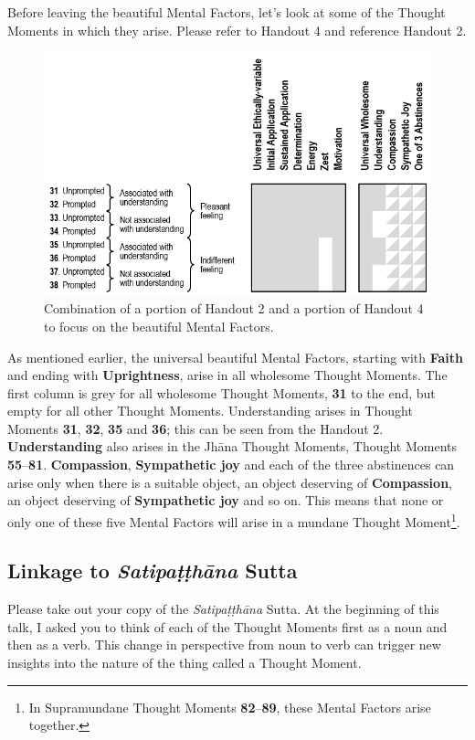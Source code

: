 Before leaving the beautiful Mental Factors, let’s look at some of the Thought Moments in which they arise. Please refer to Handout 4 and reference Handout 2.

\begin{figure}[h]
\centering
\includegraphics[width=0.9\linewidth]{./Diagrams/Wholesome}
\caption{Combination of a portion of Handout 2 and a portion of Handout 4 to focus on the beautiful Mental Factors.}
\label{fig:Wholesome}
\end{figure}

As mentioned earlier, the universal beautiful Mental Factors, starting with \textbf{Faith} and ending with \textbf{Uprightness}, arise in all wholesome Thought Moments. The first column is grey for all wholesome Thought Moments, \textbf{31} to the end, but empty for all other Thought Moments. Understanding arises in Thought Moments \textbf{31}, \textbf{32}, \textbf{35} and \textbf{36}; this can be seen from the Handout 2. \textbf{Understanding} also arises in the Jhāna Thought Moments, Thought Moments \textbf{55}--\textbf{81}. \textbf{Compassion}, \textbf{Sympathetic joy} and each of the three abstinences can arise only when there is a suitable object, an object deserving of \textbf{Compassion}, an object deserving of \textbf{Sympathetic joy} and so on. This means that none or only one of these five Mental Factors will arise in a mundane Thought Moment\footnote{In Supramundane Thought Moments \textbf{82}--\textbf{89}, these Mental Factors arise together.}.

\subsection*{Linkage to \textit{Satipaṭṭhāna} Sutta}

Please take out your copy of the \textit{Satipaṭṭhāna} Sutta. At the beginning of this talk, I asked you to think of each of the Thought Moments first as a noun and then as a verb. This change in perspective from noun to verb can trigger new insights into the nature of the thing called a Thought Moment.

